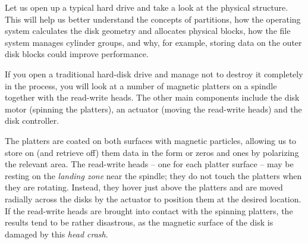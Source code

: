 Let us open up a typical hard drive and take a look at
the physical structure.  This will help us better
understand the concepts of partitions, how the
operating system calculates the disk geometry and
allocates physical blocks, how the file system manages
cylinder groups, and why, for
example, storing data on the outer disk blocks could
improve performance.

If you open a traditional hard-disk drive and manage
not to destroy it completely in the process, you will
look at a number of magnetic platters on a spindle
together with the read-write heads.  The other main
components include the disk motor (spinning the
platters), an actuator (moving the read-write heads)
and the disk controller.

The platters are coated on both surfaces with magnetic
particles, allowing us to store on (and retrieve off)
them data in the form or zeros and ones by polarizing
the relevant area.  The read-write heads -- one for
each platter surface -- may be resting on the {\em
landing zone} near the spindle; they do not touch the
platters when they are rotating.  Instead, they hover
just above the platters and are moved radially across
the disks by the actuator to position them at the
desired location.  If the read-write heads are brought
into contact with the spinning platters, the results
tend to be rather disastrous, as the magnetic surface
of the disk is damaged by this {\em head
crash}.

